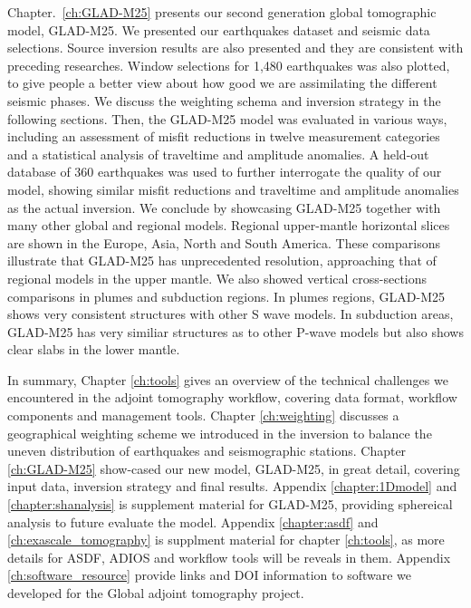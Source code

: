 Chapter.~\ref{ch:GLAD-M25} presents our second generation global tomographic model, GLAD-M25.
We presented our earthquakes dataset and seismic data selections. Source inversion
results are also presented and they are consistent with preceding researches.
Window selections for 1,480 earthquakes was also plotted, to give people a better
view about how good we are assimilating the different seismic phases.
We discuss the weighting schema and inversion strategy in the following sections.
Then, the GLAD-M25 model was evaluated in various ways, including an assessment of misfit reductions
in twelve measurement categories and
a statistical analysis of traveltime and amplitude anomalies.
A held-out database of 360 earthquakes was used to further interrogate the quality of our model,
showing similar misfit reductions and traveltime and amplitude anomalies as the actual inversion.
We conclude by showcasing GLAD-M25 together with many other global and regional models.
Regional upper-mantle horizontal slices are shown in the Europe, Asia, North and South America.
These comparisons illustrate that GLAD-M25 has unprecedented resolution, approaching that of regional models
in the upper mantle. We also showed vertical cross-sections comparisons in plumes and subduction regions.
In plumes regions, GLAD-M25 shows very consistent structures with other S wave models. In subduction
areas, GLAD-M25 has very similiar structures as to other P-wave models but also shows clear slabs 
in the lower mantle.

In summary, Chapter \ref{ch:tools} gives an overview of the technical challenges we encountered
in the adjoint tomography workflow, covering data format, workflow components and management tools.
Chapter \ref{ch:weighting} discusses a geographical weighting scheme we introduced
in the inversion to balance the uneven distribution of earthquakes and seismographic stations.
Chapter \ref{ch:GLAD-M25} show-cased our new model, GLAD-M25, in great detail, covering input data,
inversion strategy and final results.
Appendix \ref{chapter:1Dmodel} and \ref{chapter:shanalysis} is supplement material for GLAD-M25,
providing sphereical analysis to future evaluate the model. Appendix \ref{chapter:asdf} and
\ref{ch:exascale_tomography} is supplment material for chapter \ref{ch:tools}, as more details
for ASDF, ADIOS and workflow tools will be reveals in them. Appendix \ref{ch:software_resource}
provide links and DOI information to software we developed for the Global adjoint tomography project.
